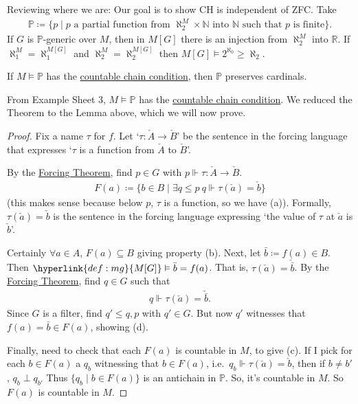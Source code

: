 \documentclass{article}
\newcommand{\p}{\mathbb{P}}
\newcommand{\1}{\mathbbm{1}}
\let\models\vDash
\let\forces\Vdash
\begin{document}
\newlec
Reviewing where we are: Our goal is to show \textsf{CH} is independent of \textsf{ZFC}.
Take
\begin{align*}
  \mathbb{P} \coloneqq \{p \mid p \text{ a partial function from } \aleph_2^M \times \mathbb{N} \text{ into } \mathbb{N} \text{ such that } p \text{ is finite}\}.
\end{align*}
If $G$ is $\p$-generic over $M$, then in $M[G]$ there is an injection from $\aleph_2^M$ into $\mathbb{R}$.
If $\aleph_1^M = \aleph_1^{M[G]}$ and $\aleph_2^M = \aleph_2^{M[G]}$ then $M[G] \models 2^{\aleph_0} \geq \aleph_2$.

\begin{thm}
  If $M \models \p$ has the \hyperlink{def:ccc}{countable chain condition}, then $\p$ preserves cardinals.
\end{thm}
From Example Sheet 3, $M \models \p$ has the \hyperlink{def:ccc}{countable chain condition}.
We reduced the Theorem to the Lemma above, which we will now prove.
\begin{proof}
  Fix a name $\tau$ for $f$.
  Let `$\tau: \check{A} \to \check{B}$' be the sentence in the forcing language that expresses `$\tau$ is a function from $\check{A}$ to $\check{B}$'.

  By the \hyperlink{thm:forcing}{Forcing Theorem}, find $p \in G$ with $p \forces \tau: \check{A} \to \check{B}$.
  \begin{align*}
    F(a) \coloneqq \{b \in B \mid \exists q \leq p \ q \forces \tau(\check{a}) = \check{b}\}
  \end{align*}
  (this makes sense because below $p$, $\tau$ is a function, so we have (a)). Formally, $\tau(\check{a}) = \check{b}$ is the sentence in the forcing language expressing `the value of $\tau$ at $\check{a}$ is $\check{b}$'.

  Certainly $\forall a \in A$, $F(a) \subseteq B$ giving property (b). Next, let $\bar{b} \coloneqq f(a) \in B$. Then $\hyperlink{def:mg}{M[G]} \models \bar{b} = f(a)$. That is, $\tau(\check{a}) = \check{\bar{b}}$.
  By the \hyperlink{thm:forcing}{Forcing Theorem}, find $q \in G$ such that
  \begin{align*}
    q \forces \tau(\check{a}) = \check{\bar{b}}.
  \end{align*}
  Since $G$ is a filter, find $q' \leq q,p$ with $q' \in G$.
  But now $q'$ witnesses that $f(a) = \bar{b} \in F(a)$, showing (d).

  Finally, need to check that each $F(a)$ is countable in $M$, to give (c).
  If I pick for each $b \in F(a)$ a $q_b$ witnessing that $b \in F(a)$, i.e.\ $q_b \forces \tau(\check{a}) = \check{b}$, then if $b \neq b'$, $q_b \perp q_{b'}$
  Thus $\{q_b \mid b \in F(a)\}$ is an antichain in $\p$.
  So, it's countable in $M$.
  So $F(a)$ is countable in $M$.
\end{proof}
\end{document}
